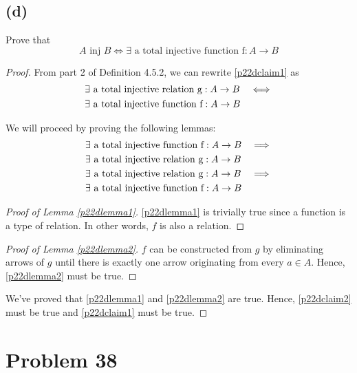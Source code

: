 \documentclass{article}
\newcommand{\inj}{\text{ inj }}
\newenvironment{subproof}[1][\proofname]{%
	\renewcommand{\qedsymbol}{$\blacksquare$}%
	\begin{proof}[#1]%
	}{%
	\end{proof}%
}
\begin{document}
\subsection{(d)}
Prove that
\begin{equation}\label{p22dclaim1}
	A \inj B \iff \exists \text{ a total injective function f} : A \rightarrow B
\end{equation}
\begin{proof}
	From part 2 of Definition 4.5.2, we can rewrite \eqref{p22dclaim1} as
	\begin{align}
		 & \exists \text{ a total injective relation g} : A \rightarrow B & \iff \notag \\ &\exists \text{ a total injective function f} : A \rightarrow B& \label{p22dclaim2}
	\end{align}

	We will proceed by proving the following lemmas:
	\begin{align}
		 & \exists \text{ a total injective function f} : A \rightarrow B & \implies \notag \\ &\exists \text{ a total injective relation g} : A \rightarrow B& \label{p22dlemma1} \\
		 & \exists \text{ a total injective relation g} : A \rightarrow B & \implies \notag \\ &\exists \text{ a total injective function f} : A \rightarrow B& \label{p22dlemma2}
	\end{align}

	\begin{subproof}[Proof of Lemma \eqref{p22dlemma1}]
		\eqref{p22dlemma1} is trivially true since a function is a type of relation.  In other words, $f$ is also a relation.
	\end{subproof}

	\begin{subproof}[Proof of Lemma \eqref{p22dlemma2}]
		$f$ can be constructed from $g$ by eliminating arrows of $g$ until there is exactly one arrow originating from every $a \in A$.  Hence, \eqref{p22dlemma2} must be true.
	\end{subproof}

	We've proved that \eqref{p22dlemma1} and \eqref{p22dlemma2} are true. Hence, \eqref{p22dclaim2} must be true and \eqref{p22dclaim1} must be true.

\end{proof}

\pagebreak
\section{Problem 38}
\end{document}
